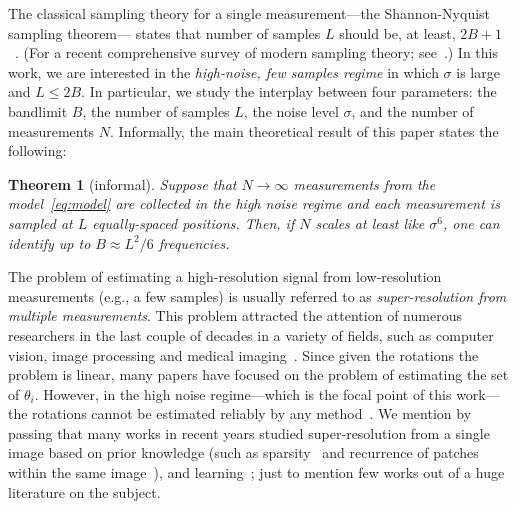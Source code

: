 \documentclass[english,12pt]{article}
\newcommand{\tB}{B}
\newtheorem{thm}{Theorem}
\numberwithin{equation}{section}
\numberwithin{thm}{section} %
\begin{document}
The classical sampling theory for a single measurement---the Shannon-Nyquist sampling theorem--- states that number of samples $L$ should be, at least, $2\tB+1$~\cite{shannon1949communication}. (For a recent comprehensive survey of modern sampling theory; see~\cite{eldar2015sampling}.)
In this work, we are interested in  the \emph{high-noise, few samples regime}  in which $\sigma$ is large  and $L\leq 2\tB$. In particular, we study the interplay between four parameters: the bandlimit $\tB$, the number of samples $L$, the noise level $\sigma$, and the number of measurements $N$. %
Informally, the main theoretical result of this paper states the following:
\begin{thm}[informal]
Suppose that $N\to\infty$ measurements from the model~\eqref{eq:model} are collected in the high noise regime and each measurement is sampled at $L$ equally-spaced positions. 
Then, if $N$ scales at least like $\sigma^6$, one can identify up to $B\approx L^2/6$ frequencies. %
\end{thm}

The problem of estimating a high-resolution signal from low-resolution measurements (e.g., a few samples) is usually referred to as \emph{super-resolution from multiple measurements}. This problem attracted the attention of numerous researchers  in the last couple of decades in a variety of fields, such as computer vision, image processing and medical imaging~\cite{park2003super,farsiu2004advances, greenspan2008super}.
Since given the rotations the problem is linear, many papers have focused on the problem of estimating the set of $\theta_i$. However, in the high noise regime---which is the focal point of this work---the rotations cannot be estimated reliably by any method~\cite{bendory2018toward,aguerrebere2016fundamental}. 
We mention by passing that many works in recent years studied super-resolution from a single image based on prior knowledge (such as sparsity~\cite{huang2009super,candes2014towards} and recurrence of patches within the same image~\cite{glasner2009super}),
and learning~\cite{lim2017enhanced}; just to mention few works out of a huge literature on the subject. 
\end{document}
